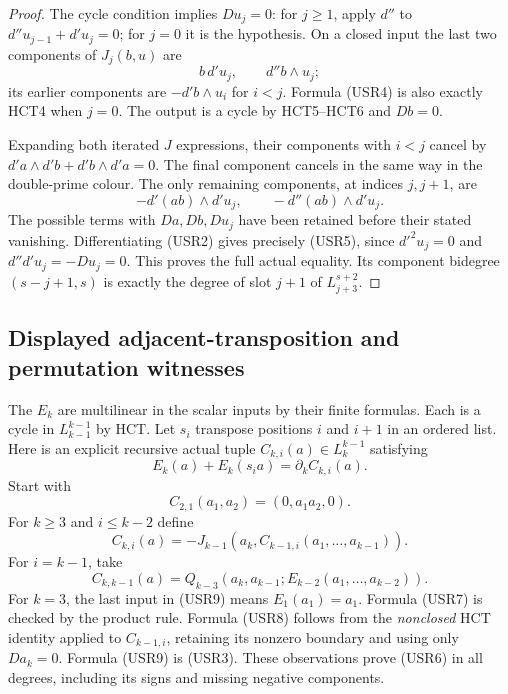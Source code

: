 \begin{proof}
The cycle condition implies $Du_j=0$: for $j\ge1$, apply $d''$
to $d''u_{j-1}+d'u_j=0$; for $j=0$ it is the hypothesis.
On a closed input the last two components of $J_j(b,u)$ are
\[
                  b\,d'u_j,\qquad d''b\wedge u_j;
 \tag{USR4}
\]
its earlier components are $-d'b\wedge u_i$ for $i<j$.
Formula (USR4) is also exactly HCT4 when $j=0$.
The output is a cycle by HCT5--HCT6 and $Db=0$.

Expanding both iterated $J$ expressions, their components with
$i<j$ cancel by $d'a\wedge d'b+d'b\wedge d'a=0$.
The final component cancels in the same way in the double-prime
colour.  The only remaining components, at indices $j,j+1$, are
\[
                   -d'(ab)\wedge d'u_j,\qquad
                   -d''(ab)\wedge d'u_j.
 \tag{USR5}
\]
The possible terms with $Da,Db,Du_j$ have been retained before
their stated vanishing.  Differentiating (USR2) gives precisely
(USR5), since $d'^2u_j=0$ and $d''d'u_j=-Du_j=0$.
This proves the full actual equality.  Its component bidegree
$(s-j+1,s)$ is exactly the degree of slot $j+1$ of
$L_{j+3}^{s+2}$.
\end{proof}

\subsection{Displayed adjacent-transposition and permutation witnesses}

The $E_k$ are multilinear in the scalar inputs by their finite
formulas.  Each is a cycle in $L_{k-1}^{k-1}$ by HCT.
Let $s_i$ transpose positions $i$ and $i+1$ in an ordered list.
Here is an explicit recursive actual tuple
$C_{k,i}(a)\in L_k^{k-1}$ satisfying
\[
                E_k(a)+E_k(s_i a)=\partial_k C_{k,i}(a).
 \tag{USR6}
\]
Start with
\[
                      C_{2,1}(a_1,a_2)=(0,a_1a_2,0).
 \tag{USR7}
\]
For $k\ge3$ and $i\le k-2$ define
\[
 C_{k,i}(a)=-J_{k-1}(a_k,C_{k-1,i}(a_1,\ldots,a_{k-1})).
 \tag{USR8}
\]
For $i=k-1$, take
\[
 C_{k,k-1}(a)=Q_{k-3}(a_k,a_{k-1};E_{k-2}(a_1,\ldots,a_{k-2})).
 \tag{USR9}
\]
For $k=3$, the last input in (USR9) means $E_1(a_1)=a_1$.
Formula (USR7) is checked by the product rule.  Formula (USR8)
follows from the \emph{nonclosed} HCT identity applied to
$C_{k-1,i}$, retaining its nonzero boundary and using only
$Da_k=0$.  Formula (USR9) is (USR3).  These observations prove
(USR6) in all degrees, including its signs and missing negative
components.

